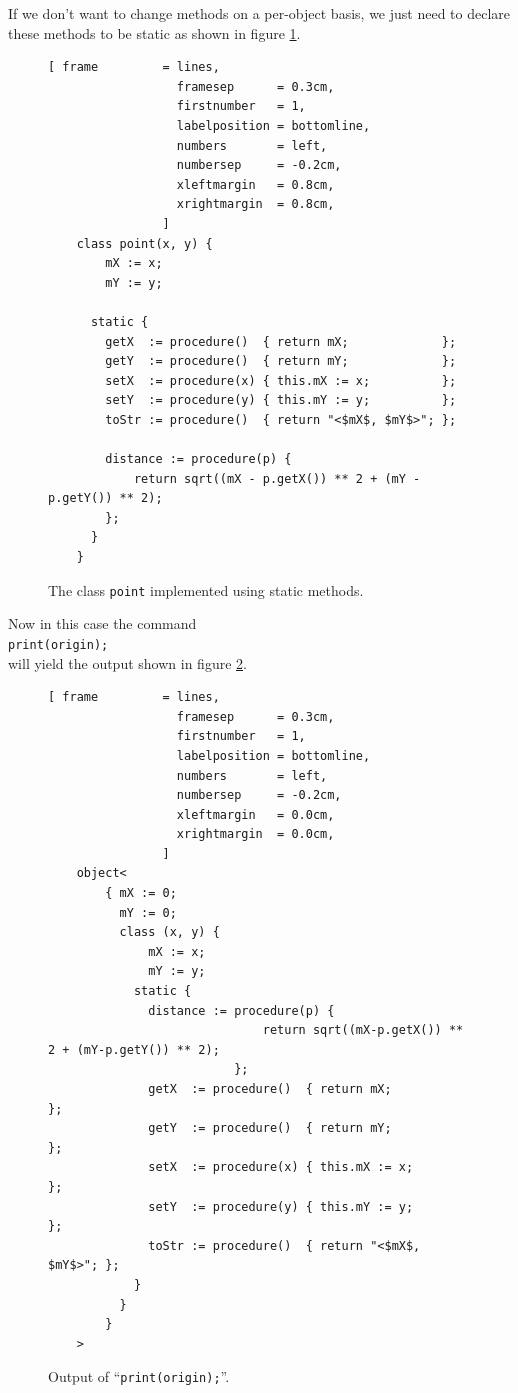 \documentclass[11pt]{report}
\begin{document}
If we don't want to change methods on a per-object basis, we just need to declare these methods to be static as shown in figure \ref{fig:point-static.stlx}.

\begin{figure}[!htb]
\centering
\begin{Verbatim}[ frame         = lines, 
                  framesep      = 0.3cm, 
                  firstnumber   = 1,
                  labelposition = bottomline,
                  numbers       = left,
                  numbersep     = -0.2cm,
                  xleftmargin   = 0.8cm,
                  xrightmargin  = 0.8cm,
                ]
    class point(x, y) {
        mX := x;
        mY := y;
    
      static {
        getX  := procedure()  { return mX;             };
        getY  := procedure()  { return mY;             };
        setX  := procedure(x) { this.mX := x;          };
        setY  := procedure(y) { this.mY := y;          };
        toStr := procedure()  { return "<$mX$, $mY$>"; };
 
        distance := procedure(p) {
            return sqrt((mX - p.getX()) ** 2 + (mY - p.getY()) ** 2);
        };
      }
    }
\end{Verbatim}
\vspace*{-0.3cm}
\caption{The class \texttt{point} implemented using static methods.}
\label{fig:point-static.stlx}
\end{figure}

Now in this case the command 
\\[0.2cm]
\hspace*{1.3cm}
\texttt{print(origin);}
\\[0.2cm]
will yield the output shown in figure \ref{fig:point-static.stlx-origin}.

\begin{figure}[!ht]
\centering
\begin{Verbatim}[ frame         = lines, 
                  framesep      = 0.3cm, 
                  firstnumber   = 1,
                  labelposition = bottomline,
                  numbers       = left,
                  numbersep     = -0.2cm,
                  xleftmargin   = 0.0cm,
                  xrightmargin  = 0.0cm,
                ]
    object<
        { mX := 0; 
          mY := 0; 
          class (x, y) { 
              mX := x; 
              mY := y; 
            static { 
              distance := procedure(p) { 
                              return sqrt((mX-p.getX()) ** 2 + (mY-p.getY()) ** 2); 
                          }; 
              getX  := procedure()  { return mX;             }; 
              getY  := procedure()  { return mY;             }; 
              setX  := procedure(x) { this.mX := x;          }; 
              setY  := procedure(y) { this.mY := y;          }; 
              toStr := procedure()  { return "<$mX$, $mY$>"; }; 
            } 
          } 
        }
    >
\end{Verbatim}
\vspace*{-0.3cm}
\caption{Output of ``\texttt{print(origin);}''.}
\label{fig:point-static.stlx-origin}
\end{figure}
\end{document}

